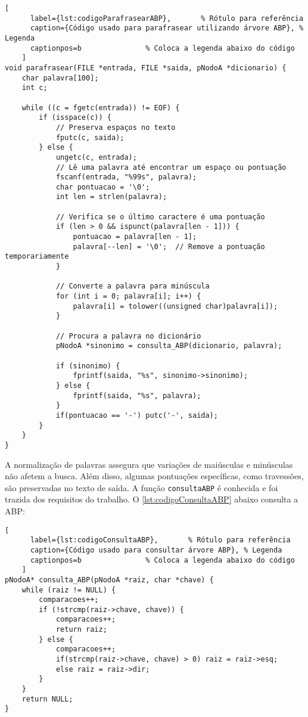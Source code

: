 \documentclass[a4paper, 12pt, english]{article}
\begin{document}
\begin{enumerate}
    \begin{lstlisting}[
      label={lst:codigoParafrasearABP},       % Rótulo para referência
      caption={Código usado para parafrasear utilizando árvore ABP}, % Legenda
      captionpos=b               % Coloca a legenda abaixo do código
    ]
void parafrasear(FILE *entrada, FILE *saida, pNodoA *dicionario) {
    char palavra[100];
    int c;

    while ((c = fgetc(entrada)) != EOF) {
        if (isspace(c)) {
            // Preserva espaços no texto
            fputc(c, saida);
        } else {
            ungetc(c, entrada);
            // Lê uma palavra até encontrar um espaço ou pontuação
            fscanf(entrada, "%99s", palavra);
            char pontuacao = '\0';
            int len = strlen(palavra);
            
            // Verifica se o último caractere é uma pontuação
            if (len > 0 && ispunct(palavra[len - 1])) {
                pontuacao = palavra[len - 1];
                palavra[--len] = '\0';  // Remove a pontuação temporariamente
            }

            // Converte a palavra para minúscula
            for (int i = 0; palavra[i]; i++) {
                palavra[i] = tolower((unsigned char)palavra[i]);
            }

            // Procura a palavra no dicionário
            pNodoA *sinonimo = consulta_ABP(dicionario, palavra);

            if (sinonimo) {
                fprintf(saida, "%s", sinonimo->sinonimo);
            } else {
                fprintf(saida, "%s", palavra);
            }
            if(pontuacao == '-') putc('-', saida);
        }
    }
}
\end{lstlisting}


A normalização de palavras assegura que variações de maiúsculas e minúsculas não afetem a busca. Além disso, algumas pontuações específicas, como travessões, são preservadas no texto de saída. A função \texttt{consultaABP} é conhecida e foi trazida dos requisitos do trabalho. O \autoref{lst:codigoConsultaABP} abaixo consulta a ABP:

    \begin{lstlisting}[
      label={lst:codigoConsultaABP},       % Rótulo para referência
      caption={Código usado para consultar árvore ABP}, % Legenda
      captionpos=b               % Coloca a legenda abaixo do código
    ]
pNodoA* consulta_ABP(pNodoA *raiz, char *chave) {
    while (raiz != NULL) {
        comparacoes++;
        if (!strcmp(raiz->chave, chave)) {
            comparacoes++;
            return raiz;
        } else {
            comparacoes++;
            if(strcmp(raiz->chave, chave) > 0) raiz = raiz->esq;
            else raiz = raiz->dir;
        }
    }
    return NULL;
}


\end{lstlisting}
\end{enumerate}
\end{document}
